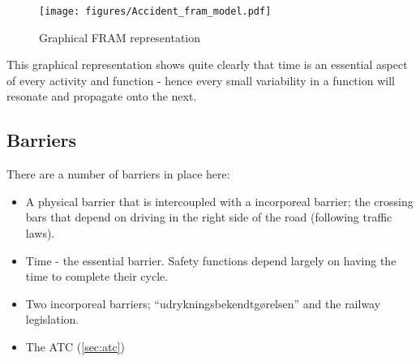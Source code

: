 \documentclass[10pt,oneside]{book}                  %
\begin{document}
\begin{figure}[h]
 \centering
   \texttt{[image: figures/Accident\_fram\_model.pdf]}
 \caption{Graphical FRAM representation}
 \label{fig:fram_graphical}
\end{figure}

This graphical representation shows quite clearly that time is an essential aspect of every activity and function - hence every small variability in a function will resonate and propagate onto the next.

\subsection{Barriers}
There are a number of barriers in place here:
\begin{itemize}
  \item A physical barrier that is intercoupled with a incorporeal barrier; the crossing bars that depend on driving in the right side of the road (following traffic laws).
  \item Time - the essential barrier. Safety functions depend largely on having the time to complete their cycle.
  \item Two incorporeal barriers; ``udrykningsbekendtgørelsen'' and the railway legislation.
  \item The ATC (\ref{sec:atc})
\end{itemize}
\end{document}
